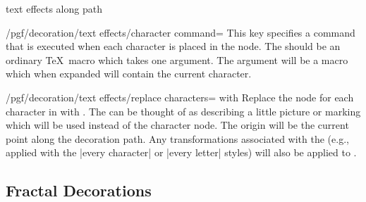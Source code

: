 \begin{decoration}{text effects along path}
    \begin{key}{/pgf/decoration/text effects/character command=}
        This key specifies a command that is executed when each character is
        placed in the node. The  should be an ordinary \TeX\ macro
        which takes one argument. The argument will be a macro which when
        expanded will contain the current character.
\begin{codeexample}[]
\def\mycommand#1{#1$_\n$}
\end{codeexample}
    \end{key}

    \begin{key}{/pgf/decoration/text effects/replace characters= with }
        Replace the node for each character in  with
        . The  can be thought of as describing a little
        picture or marking which will be used instead of the character node.
        The origin will be the current point along the decoration path. Any
        transformations associated with the  (e.g., applied
        with the |every character| or |every letter| styles) will also be
        applied to .
\begin{codeexample}[]
\end{codeexample}
    \end{key}
\end{decoration}


\subsection{Fractal Decorations}

